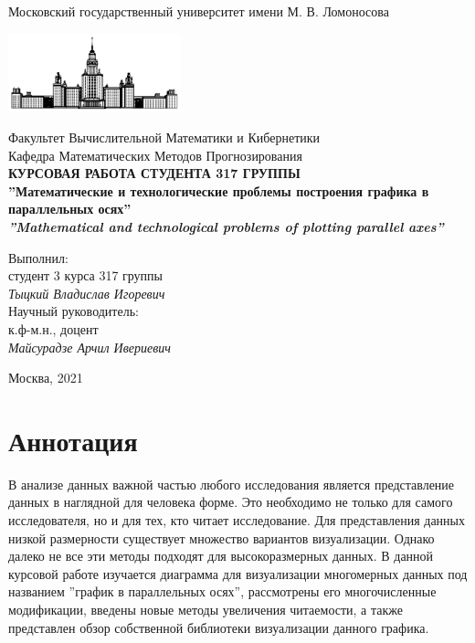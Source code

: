 \documentclass[12pt,fleqn]{article}
\begin{document}
\begin{titlepage}
    \begin{center}
        Московский государственный университет имени М. В. Ломоносова
    
        \bigskip
        \includegraphics[width=50mm]{msu.pdf}
    
        \bigskip
        Факультет Вычислительной Математики и Кибернетики\\
        Кафедра Математических Методов Прогнозирования\\[10mm]
    
        \textsf{\large\bfseries
            КУРСОВАЯ РАБОТА СТУДЕНТА 317 ГРУППЫ\\[10mm]
            ''Математические и технологические проблемы
            построения графика в параллельных осях''
            \\[5mm]
            \textit{''Mathematical and technological problems of plotting parallel axes''}
        }\\[10mm]
        
    
        \begin{flushright}
            \parbox{0.5\textwidth}{
                Выполнил:\\
                студент 3 курса 317 группы\\
                \emph{Тыцкий Владислав Игоревич}\\[5mm]
                Научный руководитель:\\
                к.ф-м.н., доцент\\
                \emph{Майсурадзе Арчил Ивериевич}
            }
        \end{flushright}
    
        \vspace{\fill}
        Москва, 2021
    \end{center}
    \end{titlepage}

\newpage
\renewcommand{\contentsname}{Содержание}

\section*{Аннотация}
В анализе данных важной частью любого исследования является представление данных в наглядной для человека форме. 
Это необходимо не только для самого исследователя, но и для тех, кто читает исследование.
Для представления данных низкой размерности существует множество
вариантов визуализации. Однако далеко не все эти методы подходят для
высокоразмерных данных. В данной курсовой работе изучается диаграмма для визуализации
многомерных данных под названием ''график в параллельных осях'', рассмотрены его
многочисленные модификации, введены новые методы увеличения читаемости, а также 
представлен обзор собственной библиотеки визуализации данного графика.
\end{document}

